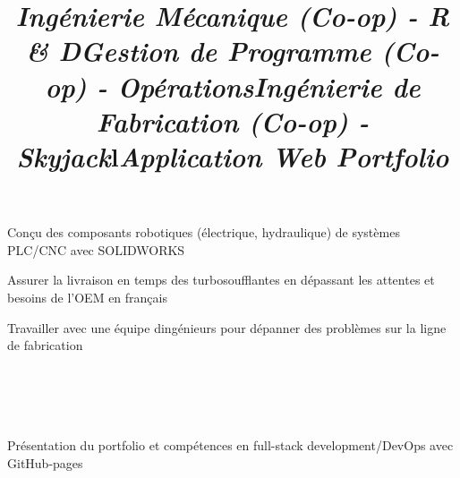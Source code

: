 \documentclass[mm]{res}
\begin{document}
\begin{resume}
\title{\textsl{Ing\'enierie M\'ecanique (Co-op) - R \& D}}
\begin{position}
\tb Con\c{c}u des composants robotiques (\'electrique, hydraulique) de syst\`emes PLC/CNC avec SOLIDWORKS
\end{position}

\title{\textsl{Gestion de Programme (Co-op) - Op\'erations}}
\begin{position}
\tb Assurer la livraison en temps des turbosoufflantes en d\'epassant les attentes et besoins de l'OEM en fran\c{c}ais
\end{position}

\title{\textsl{Ing\'enierie de Fabrication (Co-op) - Skyjack}}
\begin{position}
\tb Travailler avec une \'equipe d\textquotesingle ing\'enieurs pour d\'epanner des probl\`emes sur la ligne de fabrication
\end{position}


\toprule

\section{\headingprojects}
\begin{format}
\title{l}\\
\body\\
\end{format}

\title{\textsl{Application Web Portfolio}}
\begin{position}
\tb Pr\'esentation du portfolio et comp\'etences en full-stack development/DevOps avec GitHub-pages
\end{position}


\end{resume}
\end{document}
